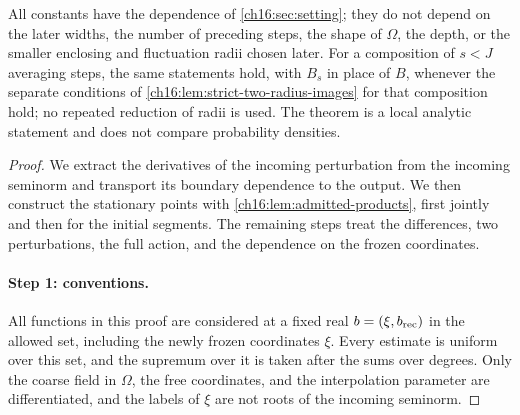 \begin{theorem}
\begin{enumerate}
\end{enumerate}
All constants have the dependence of \cref{ch16:sec:setting}; they do not depend on the later widths, the number of preceding steps, the shape of $\Omega$, the depth, or the smaller enclosing and fluctuation radii chosen later. For a composition of $s<J$ averaging steps, the same statements hold, with $B_s$ in place of $B$, whenever the separate conditions of \cref{ch16:lem:strict-two-radius-images} for that composition hold; no repeated reduction of radii is used. The theorem is a local analytic statement and does not compare probability densities.
\end{theorem}

\begin{proof}
We extract the derivatives of the incoming perturbation from the incoming seminorm and transport its boundary dependence to the output. We then construct the stationary points with \cref{ch16:lem:admitted-products}, first jointly and then for the initial segments. The remaining steps treat the differences, two perturbations, the full action, and the dependence on the frozen coordinates.

\paragraph{Step 1: conventions.}
All functions in this proof are considered at a fixed real $b=(\xi,b_{\mathrm{rec}})$ in the allowed set, including the newly frozen coordinates $\xi$. Every estimate is uniform over this set, and the supremum over it is taken after the sums over degrees. Only the coarse field in $\Omega$, the free coordinates, and the interpolation parameter are differentiated, and the labels of $\xi$ are not roots of the incoming seminorm.


\end{proof}
